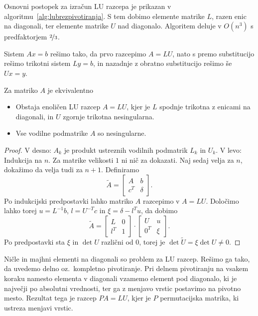 Osnovni postopek za izračun LU razcepa je prikazan v
algoritmu~\ref{alg:lubrezpivotiranja}.
S tem dobimo elemente matrike $L$, razen enic na diagonali, ter elemente matrike
$U$ nad diagonalo.
Algoritem deluje v $O(n^3)$ s predfaktorjem $\nicefrac{2}{3}$.

Sistem $Ax = b$ rešimo tako, da prvo razcepimo $A = LU$, nato s premo
substitucijo rešimo trikotni sistem $L y = b$, in nazadnje z obratno
substitucijo rešimo še $Ux = y$.


\begin{izrek}
  Za matriko $A$ je ekvivalentno
  \begin{itemize}
  \item Obstaja enoličen LU razcep $A = LU$, kjer je $L$ spodnje trikotna z
	enicami na diagonali, in $U$ zgornje trikotna nesingularna.
  \item Vse vodilne podmatrike $A$ so nesingularne.
  \end{itemize}
\end{izrek}

\begin{proof}
  V desno: $A_k$ je produkt ustreznih vodilnih podmatrik $L_k$ in $U_k$.
  V levo:
  Indukcija na $n$.
  Za matrike velikosti $1$ ni nič za dokazati.
  Naj sedaj velja za $n$, dokažimo da velja tudi za $n+1$.
  Definiramo
  \[
	\tilde{A} =
	\begin{bmatrix}
	  A & b \\ c^T & \delta
	\end{bmatrix}.
  \]
  Po indukcijski predpostavki lahko matriko $A$ razcepimo v $A = LU$.
  Določimo lahko torej $u = L^{-1} b$, $l = U^{-T} c$ in $\xi = \delta - l^T u$,
  da dobimo
  \[
	\tilde{A} =
	\begin{bmatrix}
	  L & 0 \\ l^T & 1
	\end{bmatrix}
	\cdot
	\begin{bmatrix}
	  U & u \\ 0^T & \xi
	\end{bmatrix}.
  \]
  Po predpostavki sta $\xi$ in $\det U$ različni od $0$, torej je $\det
  \tilde{U} = \xi \det U \ne 0$.
\end{proof}


Ničle in majhni elementi na diagonali so problem za LU razcep.
Rešimo ga tako, da uvedemo delno oz.~kompletno pivotiranje.
Pri delnem pivotiranju na vsakem koraku namesto elementa v diagonali vzamemo
element pod diagonalo, ki je največji po absolutni vrednosti, ter ga z menjavo
vrstic postavimo na pivotno mesto.
Rezultat tega je razcep $PA = LU$, kjer je $P$ permutacijska matrika, ki ustreza
menjavi vrstic.

